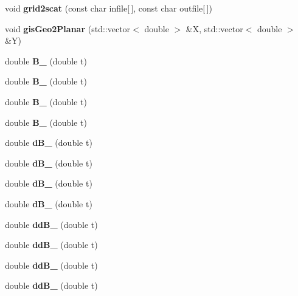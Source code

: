 \begin{DoxyCompactItemize}
\item 
void {\bfseries grid2scat} (const char infile[$\,$], const char outfile[$\,$])\label{namespaceUCBspl_a59e87b4488dcd24accc4e74870f54ed4}

\item 
void {\bfseries gisGeo2Planar} (std::vector$<$ double $>$ \&X, std::vector$<$ double $>$ \&Y)\label{namespaceUCBspl_a753a87df7acf08889b7f812a84bc1f9d}

\item 
double {\bfseries B\_} (double t)\label{namespaceUCBspl_a286fce1da0a59eeae2b2389635be3726}

\item 
double {\bfseries B\_} (double t)\label{namespaceUCBspl_a9da8e7ec54407d4ea84e4a53773facfb}

\item 
double {\bfseries B\_} (double t)\label{namespaceUCBspl_ab4e045c913205b52963bdf084ea0e678}

\item 
double {\bfseries B\_} (double t)\label{namespaceUCBspl_a6b77064940088b9aeaddd5cc137e7923}

\item 
double {\bfseries dB\_} (double t)\label{namespaceUCBspl_a423cea91f872bda3480ac07f7da592b8}

\item 
double {\bfseries dB\_} (double t)\label{namespaceUCBspl_a622a0324b53a8076b8c4bf336e204d7d}

\item 
double {\bfseries dB\_} (double t)\label{namespaceUCBspl_a61e528c6d6318a824f200452297f7be1}

\item 
double {\bfseries dB\_} (double t)\label{namespaceUCBspl_a6a8fb86ecd1b4cbfc3f16f2ed159e441}

\item 
double {\bfseries ddB\_} (double t)\label{namespaceUCBspl_ac343fb55131c88b650e6f3a750c6250c}

\item 
double {\bfseries ddB\_} (double t)\label{namespaceUCBspl_ab854c247d6aa7a6e3a50174b1993663f}

\item 
double {\bfseries ddB\_} (double t)\label{namespaceUCBspl_a62f71821506e3c2926ddb75acb6f6856}

\item 
double {\bfseries ddB\_} (double t)\label{namespaceUCBspl_a85c525b7cea79e95d127dbb97cb5fe82}


\end{DoxyCompactItemize}
